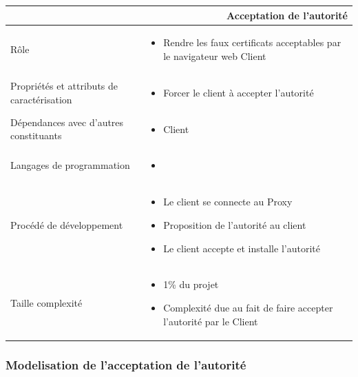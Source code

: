 \documentclass[a4paper,11pt,french]{article}
\begin{document}
\begin{center}
        \vspace*{0.7cm}
        \begin{tabularx}{16cm}{|l|X|}
        \hline
        \multicolumn{2}{|r|}{\textbf{Acceptation de l'autorité}}\\
        \hline
        R\^ole &  \begin{itemize}\item Rendre les faux certificats acceptables par le navigateur web Client\end{itemize}\\
        \hline
        Propriétés et attributs de caractérisation & \begin{itemize} \item Forcer le client à accepter l'autorité \end{itemize}\\
        \hline
        Dépendances avec d'autres constituants & \begin{itemize}\item Client\end{itemize}\\
        \hline
        Langages de programmation & \begin{itemize} \item  \end{itemize}\\
        \hline
        Procédé de développement & \begin{itemize}\item Le client se connecte au Proxy \item Proposition de l'autorité au client \item Le client accepte et installe l'autorité\end{itemize}\\
        \hline
        Taille complexité & \begin{itemize}\item 1\% du projet \item Complexité due au fait de faire accepter l'autorité par le Client \end{itemize}\\
        \hline
        \end{tabularx}
\end{center}


\subsubsection{Modelisation de l'acceptation de l'autorité}
\end{document}
